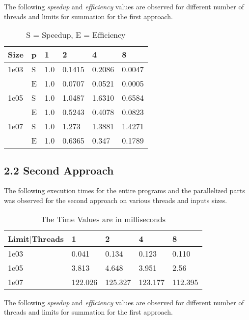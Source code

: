 \documentclass[12pt]{article}
\begin{document}
  The following \emph{speedup} and \emph{efficiency} values are observed for different number of threads and limits for summation for the first approach. \\

  \begin{table}[H]
    \begin{tabular}{llllll} \toprule
        \textbf{Size} &\textbf{p} & \textbf{1} & \textbf{2} & \textbf{4} & \textbf{8}\\\midrule
        1e03 & S & 1.0 & 0.1415 & 0.2086 & 0.0047\\
             & E & 1.0 & 0.0707 & 0.0521 & 0.0005\\
        1e05 & S & 1.0 & 1.0487 & 1.6310 & 0.6584\\
             & E & 1.0 & 0.5243 & 0.4078 & 0.0823\\
        1e07 & S & 1.0 & 1.273 & 1.3881 & 1.4271 \\
             & E & 1.0 & 0.6365 & 0.347 & 0.1789
        \\\bottomrule
      \end{tabular}
    \caption{S = Speedup, E = Efficiency}\label{Tab1}
  \end{table} 

  \subsection*{2.2 Second Approach}
  
    The following execution times for the entire programs and the parallelized parts was observed for the second approach on various threads and inputs sizes.
    \begin{table}[H]
      \begin{tabular}{lllll} \toprule
          \textbf{Limit$|$Threads}& \textbf{1} & \textbf{2} & \textbf{4} & \textbf{8}\\\midrule
          1e03 & 0.041 & 0.134 & 0.123 & 0.110\\
          1e05 & 3.813 & 4.648 & 3.951 & 2.56\\
          1e07 & 122.026 & 125.327 & 123.177 & 112.395\\
          \bottomrule
        \end{tabular}
      \caption{The Time Values are in milliseconds}\label{Tab1}
    \end{table} 

    The following \emph{speedup} and \emph{efficiency} values are observed for different number of threads and limits for summation for the first approach. \\
\end{document}

